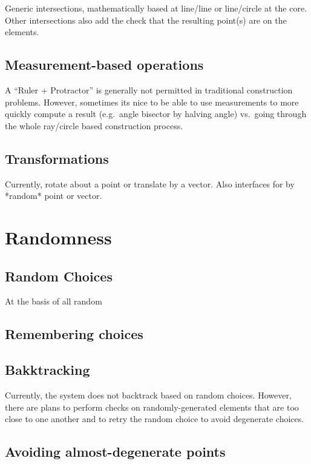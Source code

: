 Generic intersections, mathematically based at line/line or
line/circle at the core. Other intersections also add the check that
the resulting point(s) are on the elements.

\subsection{Measurement-based operations}

A ``Ruler + Protractor'' is generally not permitted in traditional
construction problems. However, sometimes its nice to be able to use
measurements to more quickly compute a result (e.g.\ angle bisector by
halving angle) vs.\ going through the whole ray/circle based
construction process.

\subsection{Transformations}

Currently, rotate about a point or translate by a vector. Also
interfaces for by *random* point or vector.

\section{Randomness}

\subsection{Random Choices}

At the basis of all random

\subsection{Remembering choices}

\subsection{Bakktracking}

Currently, the system does not backtrack based on random
choices. However, there are plans to perform checks on
randomly-generated elements that are too close to one another and to
retry the random choice to avoid degenerate choices.

\subsection{Avoiding almost-degenerate points}

